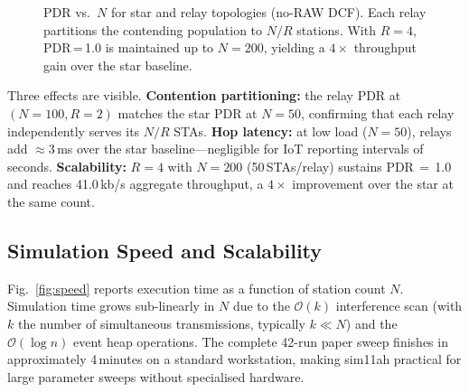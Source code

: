 \documentclass[conference]{IEEEtran}
\begin{document}
\begin{figure}[!t]
\centering
{}
\caption{PDR vs.\ $N$ for star and relay topologies (no-RAW DCF).
  Each relay partitions the contending population to $N/R$ stations.
  With $R{=}4$, PDR\,=\,1.0 is maintained up to $N{=}200$, yielding
  a $4{\times}$ throughput gain over the star baseline.}
\label{fig:relay_pdr}
\end{figure}

Three effects are visible.
\textbf{Contention partitioning:} the relay PDR at $(N{=}100, R{=}2)$
matches the star PDR at $N{=}50$, confirming that each relay independently
serves its $N/R$ STAs.
\textbf{Hop latency:} at low load ($N{=}50$), relays add ${\approx}3$\,ms
over the star baseline---negligible for IoT reporting intervals of seconds.
\textbf{Scalability:} $R{=}4$ with $N{=}200$ (50\,STAs/relay) sustains
PDR\,$=$\,1.0 and reaches 41.0\,kb/s aggregate throughput, a
$4{\times}$ improvement over the star at the same count.

\subsection{Simulation Speed and Scalability}

Fig.~\ref{fig:speed} reports execution time as a function of station
count $N$.
Simulation time grows sub-linearly in $N$ due to the $\mathcal{O}(k)$
interference scan (with $k$ the number of simultaneous transmissions,
typically $k \ll N$) and the $\mathcal{O}(\log n)$ event heap operations.
The complete 42-run paper sweep finishes in approximately 4\,minutes on a
standard workstation, making sim11ah practical for large parameter sweeps
without specialised hardware.
\end{document}
